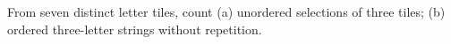 From seven distinct letter tiles, count (a) unordered selections of three tiles; (b) ordered three-letter strings without repetition.
